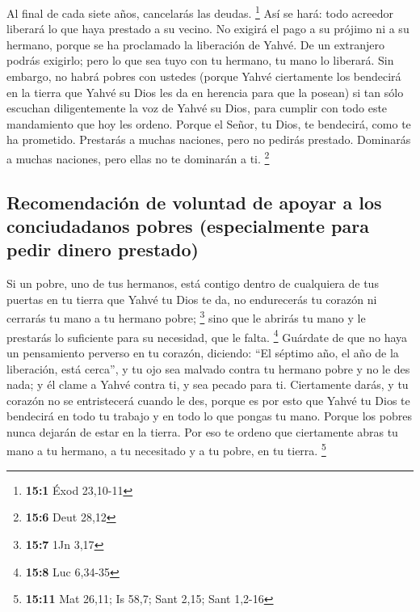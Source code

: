 \begin{paracol}{2}
 Al final de cada siete años, cancelarás las deudas.
\footnote{\textbf{15:1} Éxod 23,10-11}  Así se hará: todo
acreedor liberará lo que haya prestado a su vecino. No exigirá el pago a
su prójimo ni a su hermano, porque se ha proclamado la liberación de
Yahvé.  De un extranjero podrás exigirlo; pero lo que sea
tuyo con tu hermano, tu mano lo liberará.  Sin embargo, no
habrá pobres con ustedes (porque Yahvé ciertamente los bendecirá en la
tierra que Yahvé su Dios les da en herencia para que la posean)
 si tan sólo escuchan diligentemente la voz de Yahvé su
Dios, para cumplir con todo este mandamiento que hoy les ordeno.
 Porque el Señor, tu Dios, te bendecirá, como te ha
prometido. Prestarás a muchas naciones, pero no pedirás prestado.
Dominarás a muchas naciones, pero ellas no te dominarán a ti.
\footnote{\textbf{15:6} Deut 28,12}

\hypertarget{recomendaciuxf3n-de-voluntad-de-apoyar-a-los-conciudadanos-pobres-especialmente-para-pedir-dinero-prestado}{%
\subsection{Recomendación de voluntad de apoyar a los conciudadanos
pobres (especialmente para pedir dinero
prestado)}\label{recomendaciuxf3n-de-voluntad-de-apoyar-a-los-conciudadanos-pobres-especialmente-para-pedir-dinero-prestado}}

 Si un pobre, uno de tus hermanos, está contigo dentro de
cualquiera de tus puertas en tu tierra que Yahvé tu Dios te da, no
endurecerás tu corazón ni cerrarás tu mano a tu hermano pobre;
\footnote{\textbf{15:7} 1Jn 3,17}  sino que le abrirás tu
mano y le prestarás lo suficiente para su necesidad, que le falta.
\footnote{\textbf{15:8} Luc 6,34-35}  Guárdate de que no
haya un pensamiento perverso en tu corazón, diciendo: ``El séptimo año,
el año de la liberación, está cerca'', y tu ojo sea malvado contra tu
hermano pobre y no le des nada; y él clame a Yahvé contra ti, y sea
pecado para ti.  Ciertamente darás, y tu corazón no se
entristecerá cuando le des, porque es por esto que Yahvé tu Dios te
bendecirá en todo tu trabajo y en todo lo que pongas tu mano.
 Porque los pobres nunca dejarán de estar en la tierra.
Por eso te ordeno que ciertamente abras tu mano a tu hermano, a tu
necesitado y a tu pobre, en tu tierra. \footnote{\textbf{15:11} Mat
  26,11; Is 58,7; Sant 2,15; Sant 1,2-16}


\end{paracol}

